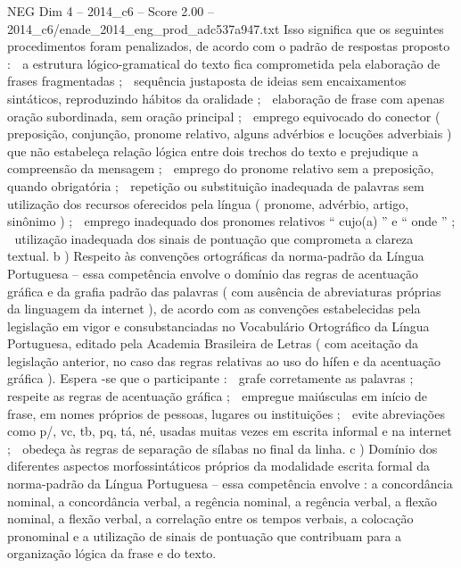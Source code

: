 \begin{textsample}{NEG Dim 4 – 2014\_c6 – Score 2.00 – 2014\_c6/enade\_2014\_eng\_prod\_adc537a947.txt}
Isso significa que os seguintes procedimentos foram penalizados, de acordo com o padrão de respostas proposto :  a estrutura lógico-gramatical do texto fica comprometida pela elaboração de frases fragmentadas ;  sequência justaposta de ideias sem encaixamentos sintáticos, reproduzindo hábitos da oralidade ;  elaboração de frase com apenas oração subordinada, sem oração principal ;  emprego equivocado do conector ( preposição, conjunção, pronome relativo, alguns advérbios e locuções adverbiais ) que não estabeleça relação lógica entre dois trechos do texto e prejudique a compreensão da mensagem ;  emprego do pronome relativo sem a preposição, quando obrigatória ;  repetição ou substituição inadequada de palavras sem utilização dos recursos oferecidos pela língua ( pronome, advérbio, artigo, sinônimo ) ;  emprego inadequado dos pronomes relativos “ cujo(a) ” e “ onde ” ;  utilização inadequada dos sinais de pontuação que comprometa a clareza textual. b ) Respeito às convenções ortográficas da norma-padrão da Língua Portuguesa – essa competência envolve o domínio das regras de acentuação gráfica e da grafia padrão das palavras ( com ausência de abreviaturas próprias da linguagem da internet ), de acordo com as convenções estabelecidas pela legislação em vigor e consubstanciadas no Vocabulário Ortográfico da Língua Portuguesa, editado pela Academia Brasileira de Letras ( com aceitação da legislação anterior, no caso das regras relativas ao uso do hífen e da acentuação gráfica ).
Espera -se que o participante :  grafe corretamente as palavras ;  respeite as regras de acentuação gráfica ;  empregue maiúsculas em início de frase, em nomes próprios de pessoas, lugares ou instituições ;  evite abreviações como p/, vc, tb, pq, tá, né, usadas muitas vezes em escrita informal e na internet ;  obedeça às regras de separação de sílabas no final da linha. c ) Domínio dos diferentes aspectos morfossintáticos próprios da modalidade escrita formal da norma-padrão da Língua Portuguesa – essa competência envolve : a concordância nominal, a concordância verbal, a regência nominal, a regência verbal, a flexão nominal, a flexão verbal, a correlação entre os tempos verbais, a colocação pronominal e a utilização de sinais de pontuação que contribuam para a organização lógica da frase e do texto.

\end{textsample}
